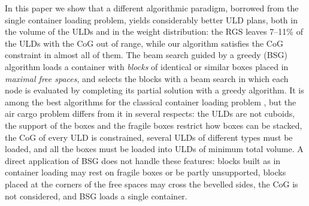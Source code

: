 In this paper we show that a different algorithmic paradigm, borrowed from the single container
loading problem, yields considerably better ULD plans, both in the volume of the ULDs and in the
weight distribution: the RGS leaves 7--11\% of the ULDs with the CoG out of range, while our
algorithm satisfies the CoG constraint in almost all of them. The beam search guided by a greedy
(BSG) algorithm \citep{Araya2014,Araya2017} loads a container with \emph{blocks} of identical
or similar boxes placed in \emph{maximal free spaces}, and selects the blocks with a beam search
in which each node is evaluated by completing its partial solution with a greedy algorithm. It
is among the best algorithms for the classical container loading problem
\citep{Araya2017,Araya2020}, but the air cargo problem differs from it in several respects:
the ULDs are not cuboids, the support of the boxes and the fragile boxes restrict how boxes can
be stacked, the CoG of every ULD is constrained, several ULDs of different types must be loaded,
and all the boxes must be loaded into ULDs of minimum total volume. A direct application of BSG
does not handle these features: blocks built as in container loading may rest on fragile boxes
or be partly unsupported, blocks placed at the corners of the free spaces may cross the bevelled
sides, the CoG is not considered, and BSG loads a single container.

